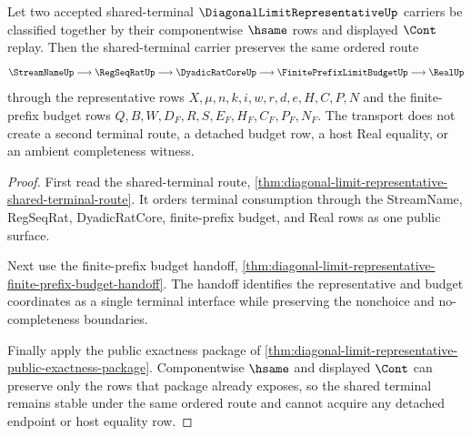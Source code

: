 \begin{theorem}
\label{thm:diagonal-limit-representative-shared-terminal-stability}
Let two accepted shared-terminal $\DiagonalLimitRepresentativeUp$ carriers be classified together by their componentwise $\hsame$ rows and displayed $\Cont$ replay. Then the shared-terminal carrier preserves the same ordered route
$$
\StreamNameUp \longrightarrow \RegSeqRatUp \longrightarrow \DyadicRatCoreUp \longrightarrow \FinitePrefixLimitBudgetUp \longrightarrow \RealUp
$$
through the representative rows $X,\mu,n,k,i,w,r,d,e,H,C,P,N$ and the finite-prefix budget rows $Q,B,W,D_F,R,S,E_F,H_F,C_F,P_F,N_F$. The transport does not create a second terminal route, a detached budget row, a host Real equality, or an ambient completeness witness.
\end{theorem}
\begin{proof}
First read the shared-terminal route, \autoref{thm:diagonal-limit-representative-shared-terminal-route}. It orders terminal consumption through the StreamName, RegSeqRat, DyadicRatCore, finite-prefix budget, and Real rows as one public surface.

Next use the finite-prefix budget handoff, \autoref{thm:diagonal-limit-representative-finite-prefix-budget-handoff}. The handoff identifies the representative and budget coordinates as a single terminal interface while preserving the nonchoice and no-completeness boundaries.

Finally apply the public exactness package of \autoref{thm:diagonal-limit-representative-public-exactness-package}. Componentwise $\hsame$ and displayed $\Cont$ can preserve only the rows that package already exposes, so the shared terminal remains stable under the same ordered route and cannot acquire any detached endpoint or host equality row.
\end{proof}

